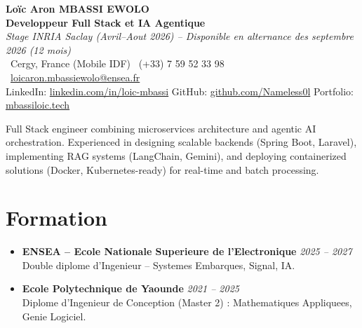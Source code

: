 \documentclass[a4paper,11pt]{article}
\begin{document}
\begin{center}
    {\Large \textbf{Lo\"ic Aron MBASSI EWOLO}} \\ \vspace{4pt}
    \textbf{\large Developpeur Full Stack et IA Agentique} \\
    \textit{\small Stage INRIA Saclay (Avril--Aout 2026) -- Disponible en alternance des septembre 2026 (12 mois)} \\ \vspace{4pt}
    \small
    \Pointinghand\ Cergy, France (Mobile IDF) \quad
    \Mobilefone\ (+33) 7 59 52 33 98 \quad
    {\color{primary}\Letter\ \href{mailto:loicaron.mbassiewolo@ensea.fr}{loicaron.mbassiewolo@ensea.fr}} \\ \vspace{2pt}
    {\color{primary}LinkedIn: \href{https://www.linkedin.com/in/loic-mbassi/}{linkedin.com/in/loic-mbassi}} \quad
    {\color{primary}GitHub: \href{https://github.com/Nameless0l}{github.com/Nameless0l}} \quad
    {\color{primary}Portfolio: \href{https://mbassiloic.tech}{mbassiloic.tech}}
\end{center}

\vspace{-6pt}

\noindent\small{Full Stack engineer combining microservices architecture and agentic AI orchestration. Experienced in designing scalable backends (Spring Boot, Laravel), implementing RAG systems (LangChain, Gemini), and deploying containerized solutions (Docker, Kubernetes-ready) for real-time and batch processing.}

\section{Formation}
\begin{itemize}[leftmargin=*, label=\tiny$\bullet$, nosep]
    \item \textbf{ENSEA -- Ecole Nationale Superieure de l'Electronique} \hfill \textit{2025 -- 2027} \\
    \small{Double diplome d'Ingenieur -- Systemes Embarques, Signal, IA.}
    \item \textbf{Ecole Polytechnique de Yaounde} \hfill \textit{2021 -- 2025} \\
    \small{Diplome d'Ingenieur de Conception (Master 2) : Mathematiques Appliquees, Genie Logiciel.}
\end{itemize}
\end{document}
